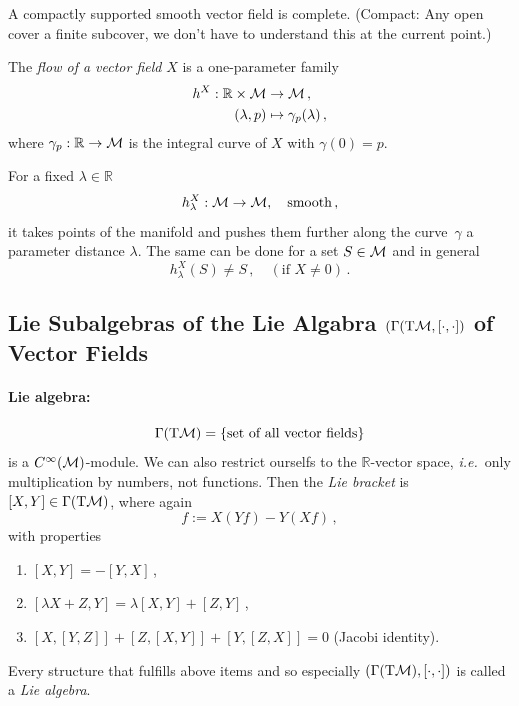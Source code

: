 \documentclass[11pt, a4paper, twocolumn]{article} %
\begin{document}
\begin{theorem}[]
    A compactly supported smooth vector field is complete.
    (Compact: Any open cover a finite subcover, we don't have to understand this at
    the current point.)
\end{theorem}
\begin{defn}
    The \textit{flow of a vector field} $X$ is a one-parameter family
    \begin{align}
        h^X: \mathbb{R}\times\mathcal{M} &\to \mathcal{M}\,,\\
        (\lambda, p) &\mapsto \gamma_p(\lambda)\,,
    \end{align}
    where $\gamma_p:\mathbb{R}\to\mathcal{M}$ is the integral curve of $X$ with
    $\gamma(0) = p$.
\end{defn}
\begin{note}
    For a fixed $\lambda\in\mathbb{R}$
    \begin{equation}
        h^X_\lambda: \mathcal{M} \to \mathcal{M}, \quad\text{smooth}\,,
    \end{equation}
    it takes points of the manifold and pushes them further along the 
    curve~$\gamma$ a parameter distance $\lambda$.
    The same can be done for a set $S\in\mathcal{M}$ and in general
    \begin{equation}
        h^X_\lambda(S) \neq S\,,\quad(\text{if }X\neq 0)\,.
    \end{equation}
\end{note}

\subsection[Lie Subalgebras of the Lie Algabra of Vector Fields]{Lie Subalgebras of the
    Lie Algabra $(\Gamma(\T \M, [\cdot,\cdot])$ of Vector Fields}
    \paragraph{Lie algebra:}
    \begin{equation}
        \Gamma(\T\M) = \{\text{set of all vector fields}\}
    \end{equation}
    is a $C^\infty(\mathcal{M})$-module.
    We can also restrict ourselfs to the $\mathbb{R}$-vector space,
    \textit{i.e.}\ only multiplication by numbers, not functions.
    Then the \textit{Lie bracket} is $[X,Y]\in\Gamma(\T\M)$, where again
    \begin{equation}
        [X,Y]f := X(Yf) - Y(Xf)\,,
    \end{equation}
    with properties
    \begin{enumerate}
        \item $[X,Y] = - [Y,X]$\,,
        \item $[\lambda X + Z, Y] = \lambda[X,Y] + [Z, Y]$\,,
        \item $[X,[Y,Z]] + [Z,[X,Y]] + [Y, [Z,X]] = 0$ (Jacobi identity).
    \end{enumerate}
    Every structure that fulfills above items and so especially
    $(\Gamma(\T\M), [\cdot,\cdot])$ is called a \textit{Lie algebra}.
\end{document}
